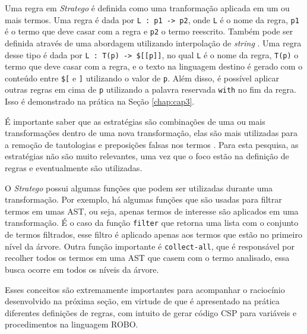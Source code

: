 Uma regra em \textit{Stratego} é definida como uma tranformação aplicada em um ou mais termos. Uma regra é dada por \texttt{L : p1 -> p2}, onde \texttt{L} é o nome da regra, \texttt{p1} é o termo que deve casar com a regra e \texttt{p2} o termo reescrito. Também pode ser definida através de uma abordagem utilizando interpolação de \textit{string} \cite{KatsSpoofax}. Uma regra desse tipo é dada por \texttt{L : T(p) -> \$[[p]]}, no qual \texttt{L} é o nome da regra, \texttt{T(p)} o termo que deve casar com a regra, e o texto na linguagem destino é gerado com o conteúdo entre \texttt{\$[} e \texttt{]} utilizando o valor de \texttt{p}. Além disso, é possível aplicar outras regras em cima de \texttt{p} utilizando a palavra reservada \texttt{with} no fim da regra. Isso é demonstrado na prática na Seção \ref{chap:cap3}.

É importante saber que as estratégias são combinações de uma ou mais transformações dentro de uma nova transformação, elas são mais utilizadas para a remoção de tautologias e preposições falsas nos termos \cite{KatsSpoofax}. Para esta pesquisa, as estratégias não são muito relevantes, uma vez que o foco estão na definição de regras e eventualmente são utilizadas.

O \textit{Stratego} possui algumas funções que podem ser utilizadas durante uma transformação. Por exemplo, há algumas funções que são usadas para filtrar termos em umas AST, ou seja, apenas termos de interesse são aplicados em uma transformação. É o caso da função \texttt{filter} que retorna uma lista com o conjunto de termos filtrados, esse filtro é aplicado apenas aos termos que estão no primeiro nível da árvore. Outra função importante é \texttt{collect-all}, que é responsável por recolher todos os termos em uma AST que casem com o termo analisado, essa busca ocorre em todos os níveis da árvore.

Esses conceitos são extremamente importantes para acompanhar o raciocínio desenvolvido na próxima seção, em virtude de que é apresentado na prática diferentes definições de regras, com intuito de gerar código CSP para variáveis e procedimentos na linguagem ROBO.